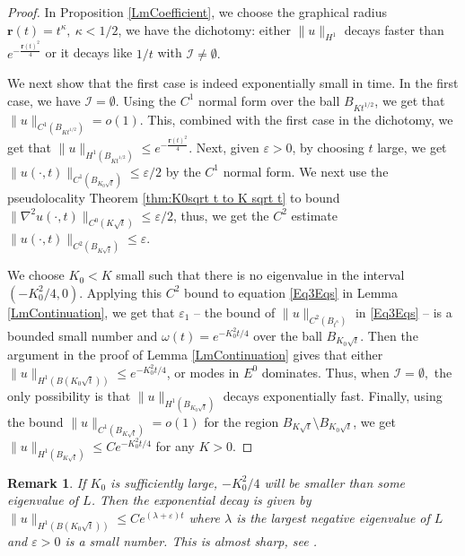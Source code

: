 \documentclass[11pt]{amsart}
\numberwithin{equation}{section}
\newtheorem{remark}[theorem]{Remark}
\numberwithin{equation}{section}
\newcommand{\eps}{\varepsilon}
\begin{document}
	\begin{proof}
		In  Proposition \ref{LmCoefficient}, we choose the graphical radius $\mathbf{r}(t)=t^\kappa,\ \kappa<1/2$, we have the dichotomy: either $\|u\|_{H^1}$ decays faster than $e^{-\frac{\mathbf{r}(t)^2}{4}}$ or it decays like $1/t$ with $\mathcal I\neq \emptyset.$ 
		
		We next show that the first case is indeed exponentially small in time. In the first case, we have $\mathcal I=\emptyset.$ Using the $C^1$ normal form over the ball $B_{Kt^{1/2}}$, we get that $\|u\|_{C^1(B_{Kt^{1/2}})}=o(1)$. This, combined with the first case in the dichotomy, we get that $\|u\|_{H^1(B_{Kt^{1/2}})}\leq e^{-\frac{\mathbf{r}(t)^2}{4}}$. Next, given $\eps>0$, by choosing $t$ large, we get $\|u(\cdot,t)\|_{C^1(B_{K_0\sqrt{t}})}\leq \eps/2$ by the $C^1$ normal form. We next use the pseudolocality Theorem \ref{thm:K0sqrt t to K sqrt t} to bound $\|\nabla ^2u(\cdot,t)\|_{C^0(K\sqrt{t})}\leq \eps/2$, thus, we get the $C^2$ estimate $\|u(\cdot,t)\|_{C^2(B_{K\sqrt{t}})}\leq \eps$.
		
		We choose $K_0<K$ small such that there is no eigenvalue in the interval $(-K_0^2/4,0)$. Applying this $C^2$ bound to equation \eqref{Eq3Eqs} in Lemma \ref{LmContinuation}, we get that $\eps_1$ -- the bound of $\|u\|_{C^2(B_{t^\kappa})}$ in \eqref{Eq3Eqs} -- is a bounded small number and $\omega(t)=e^{-K_0^2t/4}$ over the ball $B_{K_0\sqrt{t}}$. Then the argument in the proof of Lemma \ref{LmContinuation} gives that either $\|u\|_{H^1(B(K_0\sqrt{t}))}\leq e^{-K_0^2t/4}$, or modes in $E^0$ dominates. Thus, when $\mathcal I=\emptyset,$ the only possibility is that $\|u\|_{H^1(B_{K_0\sqrt{t}})}$ decays exponentially fast. Finally, using the bound $\|u\|_{C^1(B_{K\sqrt{t}})}=o(1)$ for the region $B_{K\sqrt{t}}\setminus B_{K_0\sqrt{t}}$, we get $\|u\|_{H^1(B_{K\sqrt{t}})}\leq C e^{-K_0^2t/4}$ for any $K>0$.
		
	\end{proof}
	
	\begin{remark}
		If $K_0$ is sufficiently large, $-K_0^2/4$ will be smaller than some eigenvalue of $L$. Then the exponential decay is given by $\|u\|_{H^1(B(K_0\sqrt{t}))}\leq Ce^{(\lambda+\eps) t}$ where $\lambda$ is the largest negative eigenvalue of $L$ and $\eps>0$ is a small number. This is almost sharp, see \cite{SunWangXue2_RegSing}.
	\end{remark}
	
	
	
	\appendix
	
\end{document}
